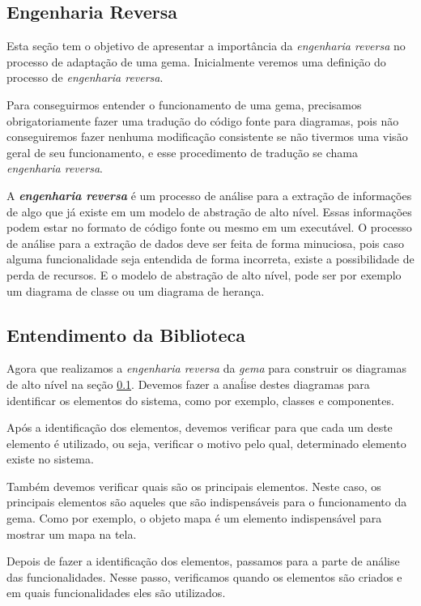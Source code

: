 \subsection{Engenharia Reversa}
\label{subsection:engenharia_reversa}


Esta seção tem o objetivo de apresentar a importância da \emph{engenharia reversa} no processo de adaptação
de uma gema. Inicialmente veremos uma definição do processo de \emph{engenharia reversa}.

Para conseguirmos entender o funcionamento de uma gema, precisamos obrigatoriamente fazer uma tradução
do código fonte para diagramas, pois não conseguiremos fazer nenhuma modificação consistente
se não tivermos uma visão geral de seu funcionamento, e esse procedimento de tradução se chama
\emph{engenharia reversa}.

A \textbf{\emph{engenharia reversa}} é um processo de análise para a extração de informações de algo que já
existe em um modelo de abstração de alto nível. Essas informações podem estar no formato de código
fonte ou mesmo em um executável. O processo de análise para a extração de dados deve ser feita de forma
minuciosa, pois caso alguma funcionalidade seja entendida de forma incorreta, existe a possibilidade de
perda de recursos. E o modelo de abstração de alto nível, pode ser por exemplo um diagrama de classe
ou um diagrama de herança.


\subsection{Entendimento da Biblioteca}
\label{subsection:entendimento_da_biblioteca}


Agora que realizamos a \emph{engenharia reversa} da \emph{gema} para construir os diagramas
de alto nível na seção \ref{subsection:engenharia_reversa}. Devemos fazer a anaĺise destes
diagramas para identificar os elementos do sistema, como por exemplo, classes e componentes.

Após a identificação dos elementos, devemos verificar para que cada um deste elemento é utilizado, ou seja,
verificar o motivo pelo qual, determinado elemento existe no sistema.

Também devemos verificar quais são os principais elementos. Neste caso, os principais elementos
são aqueles que são indispensáveis para o funcionamento da gema. Como por exemplo, o objeto mapa
é um elemento indispensável para mostrar um mapa na tela.

Depois de fazer a identificação dos elementos, passamos para a parte de análise das funcionalidades.
Nesse passo, verificamos quando os elementos são criados e em quais funcionalidades eles são utilizados.


